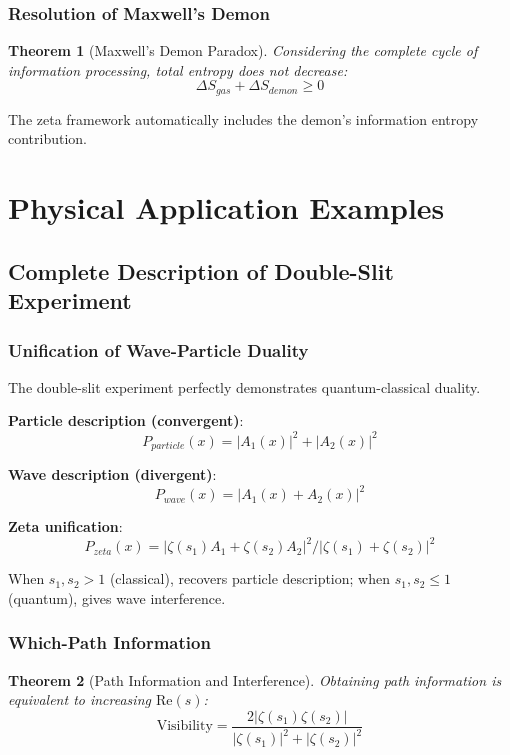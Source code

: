 \documentclass[11pt]{article}
\theoremstyle{plain}
\newtheorem{theorem}{Theorem}[section]
\theoremstyle{definition}
\theoremstyle{remark}
\begin{document}
\subsubsection{Resolution of Maxwell's Demon}

\begin{theorem}[Maxwell's Demon Paradox]
Considering the complete cycle of information processing, total entropy does not decrease:
$$\Delta S_{gas} + \Delta S_{demon} \geq 0$$
\end{theorem}

The zeta framework automatically includes the demon's information entropy contribution.

\section{Physical Application Examples}

\subsection{Complete Description of Double-Slit Experiment}

\subsubsection{Unification of Wave-Particle Duality}

The double-slit experiment perfectly demonstrates quantum-classical duality.

\textbf{Particle description (convergent)}:
$$P_{particle}(x) = |A_1(x)|^2 + |A_2(x)|^2$$

\textbf{Wave description (divergent)}:
$$P_{wave}(x) = |A_1(x) + A_2(x)|^2$$

\textbf{Zeta unification}:
$$P_{zeta}(x) = |\zeta(s_1)A_1 + \zeta(s_2)A_2|^2 / |\zeta(s_1) + \zeta(s_2)|^2$$

When $s_1, s_2 > 1$ (classical), recovers particle description; when $s_1, s_2 \leq 1$ (quantum), gives wave interference.

\subsubsection{Which-Path Information}

\begin{theorem}[Path Information and Interference]
Obtaining path information is equivalent to increasing $\text{Re}(s)$:
$$\text{Visibility} = \frac{2|\zeta(s_1)\zeta(s_2)|}{|\zeta(s_1)|^2 + |\zeta(s_2)|^2}$$
\end{theorem}
\end{document}

